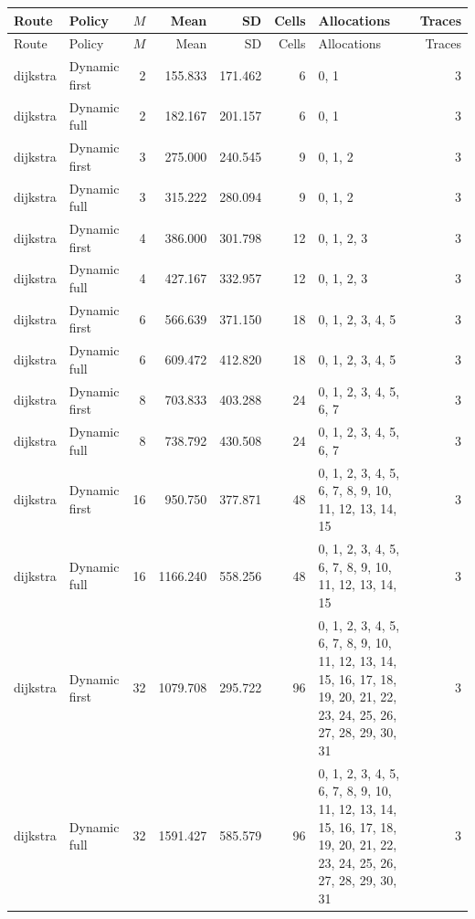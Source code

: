 \documentclass[10pt,a4paper]{article}
\begin{document}
\tiny\setlength{\tabcolsep}{2pt}\begin{longtable}{@{}p{23mm}p{29mm}rrrrp{36mm}r@{}}
\toprule Route & Policy & $M$ & Mean & SD & Cells & Allocations & Traces \\ \midrule\endfirsthead
\toprule Route & Policy & $M$ & Mean & SD & Cells & Allocations & Traces \\ \midrule\endhead
\bottomrule\endfoot
dijkstra & Dynamic first & 2 & 155.833 & 171.462 & 6 & 0, 1 & 3 \\
dijkstra & Dynamic full & 2 & 182.167 & 201.157 & 6 & 0, 1 & 3 \\
dijkstra & Dynamic first & 3 & 275.000 & 240.545 & 9 & 0, 1, 2 & 3 \\
dijkstra & Dynamic full & 3 & 315.222 & 280.094 & 9 & 0, 1, 2 & 3 \\
dijkstra & Dynamic first & 4 & 386.000 & 301.798 & 12 & 0, 1, 2, 3 & 3 \\
dijkstra & Dynamic full & 4 & 427.167 & 332.957 & 12 & 0, 1, 2, 3 & 3 \\
dijkstra & Dynamic first & 6 & 566.639 & 371.150 & 18 & 0, 1, 2, 3, 4, 5 & 3 \\
dijkstra & Dynamic full & 6 & 609.472 & 412.820 & 18 & 0, 1, 2, 3, 4, 5 & 3 \\
dijkstra & Dynamic first & 8 & 703.833 & 403.288 & 24 & 0, 1, 2, 3, 4, 5, 6, 7 & 3 \\
dijkstra & Dynamic full & 8 & 738.792 & 430.508 & 24 & 0, 1, 2, 3, 4, 5, 6, 7 & 3 \\
dijkstra & Dynamic first & 16 & 950.750 & 377.871 & 48 & 0, 1, 2, 3, 4, 5, 6, 7, 8, 9, 10, 11, 12, 13, 14, 15 & 3 \\
dijkstra & Dynamic full & 16 & 1166.240 & 558.256 & 48 & 0, 1, 2, 3, 4, 5, 6, 7, 8, 9, 10, 11, 12, 13, 14, 15 & 3 \\
dijkstra & Dynamic first & 32 & 1079.708 & 295.722 & 96 & 0, 1, 2, 3, 4, 5, 6, 7, 8, 9, 10, 11, 12, 13, 14, 15, 16, 17, 18, 19, 20, 21, 22, 23, 24, 25, 26, 27, 28, 29, 30, 31 & 3 \\
dijkstra & Dynamic full & 32 & 1591.427 & 585.579 & 96 & 0, 1, 2, 3, 4, 5, 6, 7, 8, 9, 10, 11, 12, 13, 14, 15, 16, 17, 18, 19, 20, 21, 22, 23, 24, 25, 26, 27, 28, 29, 30, 31 & 3 \\
\end{longtable}\normalsize\setlength{\tabcolsep}{6pt}
\clearpage
\end{document}
